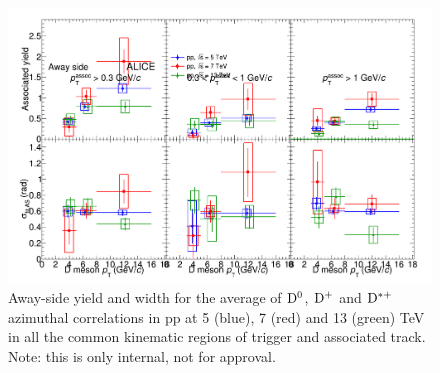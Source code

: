 \begin{figure}
\centering
\includegraphics[width=.96\textwidth]{figures/ComparisonToOtherpp/CompareFitResults_DiffppEnergies_AwaySide.png}
\caption{Away-side yield and width for the average of ${\rm D^0}$, ${\rm D^+}$ and ${\rm D^{*+}}$ azimuthal correlations in pp at 5 (blue), 7 (red) and 13 (green) TeV in all the common kinematic regions of trigger and associated track. Note: this is only internal, not for approval.}
\label{fig:AllppFit2}
\end{figure}


